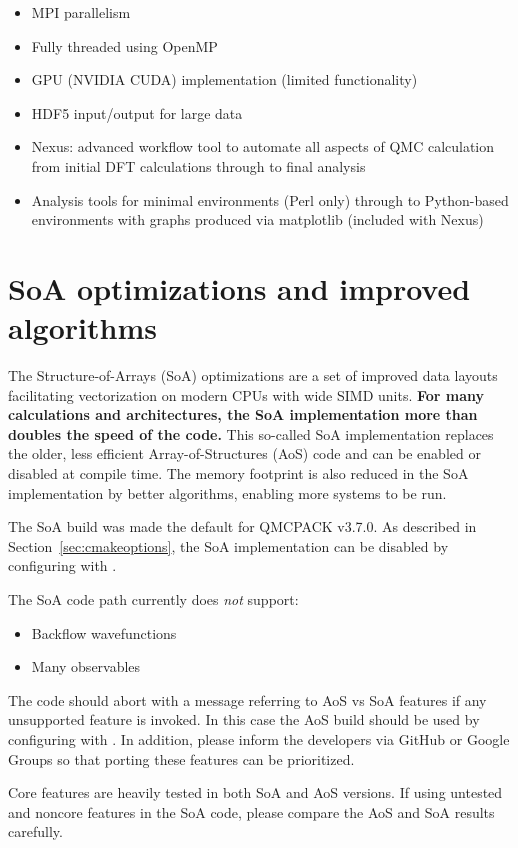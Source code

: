 \begin{itemize}
\item MPI parallelism
\item Fully threaded using OpenMP
\item GPU (NVIDIA CUDA) implementation (limited functionality)
\item HDF5 input/output for large data
\item Nexus: advanced workflow tool to automate all aspects of QMC calculation from initial DFT calculations through to final analysis
\item Analysis tools for minimal environments (Perl only) through to
  Python-based environments with graphs produced via matplotlib (included with Nexus)
\end{itemize}

\section{SoA optimizations and improved algorithms}
The Structure-of-Arrays (SoA) optimizations \cite{IPCC_SC17} are a set
of improved data layouts facilitating vectorization on modern CPUs
with wide SIMD units.  \textbf{For many calculations and
  architectures, the SoA implementation more than doubles the speed of
  the code.}  This so-called SoA implementation replaces the older, less efficient
Array-of-Structures (AoS) code and can be enabled or disabled at compile time. The memory footprint is
also reduced in the SoA implementation by better
algorithms, enabling more systems to be run.

The SoA build was made the default for QMCPACK v3.7.0. As described in Section~\ref{sec:cmakeoptions}, the SoA
implementation can be disabled by configuring with .

The SoA code path currently does \textit{not} support:
\begin{itemize}
\item Backflow wavefunctions
\item Many observables
\end{itemize}
  
The code should abort with a message referring to AoS vs SoA features
if any unsupported feature is invoked. In this case the AoS build
should be used by configuring with . In
addition, please inform the developers via GitHub or Google Groups so
that porting these features can be prioritized.

Core features are heavily tested in both SoA and AoS versions. If
using untested and noncore features in the SoA code,
please compare the AoS and SoA results carefully.

